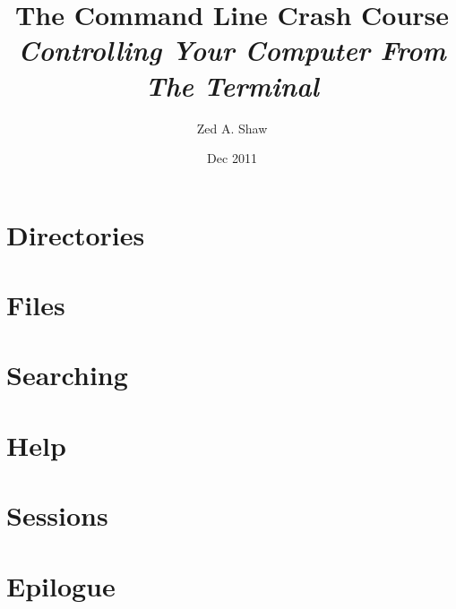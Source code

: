


\title{
    The Command Line Crash Course\\
    \textit{Controlling Your Computer From The Terminal}
}
\author{Zed A. Shaw}
\date{Dec 2011}



\frontmatter

\maketitle

\tableofcontents


\mainmatter







\part{Directories}







\part{Files}










\part{Searching}




\part{Help}




\part{Sessions}





\part{Epilogue}



\appendix


